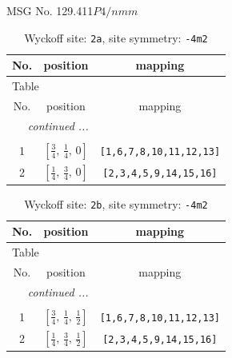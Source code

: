 \documentclass[fleqn,8pt]{jsarticle}
\begin{document}
\setcounter{MaxMatrixCols}{32}

\renewcommand{\tablename}{Table~}
\renewcommand{\figurename}{Figure~}
\begin{center}
\LARGE
MSG No. 129.411\quad$P4/nmm$
\end{center}
\renewcommand{\arraystretch}{1.2}
\begin{longtable}{ccc}
\caption{Wyckoff site: {\tt 2a}, site symmetry: {\tt -4m2}}
 \\
 \hline \hline
No. & position & mapping \\ \hline \endfirsthead

\multicolumn{2}{l}{\tablename\ \thetable{}} \\
 \hline \hline
No. & position & mapping \\ \hline \endhead

 \hline \hline
\multicolumn{2}{r}{\footnotesize\it continued ...} \\ \endfoot

 \hline \hline
\multicolumn{2}{r}{} \\ \endlastfoot

1 & $\left[ \frac{3}{4},\, \frac{1}{4},\, 0 \right]$ & {\tt [1,6,7,8,10,11,12,13]} \\ \hline
2 & $\left[ \frac{1}{4},\, \frac{3}{4},\, 0 \right]$ & {\tt [2,3,4,5,9,14,15,16]} \\
\end{longtable}
\renewcommand{\arraystretch}{1.2}
\begin{longtable}{ccc}
\caption{Wyckoff site: {\tt 2b}, site symmetry: {\tt -4m2}}
 \\
 \hline \hline
No. & position & mapping \\ \hline \endfirsthead

\multicolumn{2}{l}{\tablename\ \thetable{}} \\
 \hline \hline
No. & position & mapping \\ \hline \endhead

 \hline \hline
\multicolumn{2}{r}{\footnotesize\it continued ...} \\ \endfoot

 \hline \hline
\multicolumn{2}{r}{} \\ \endlastfoot

1 & $\left[ \frac{3}{4},\, \frac{1}{4},\, \frac{1}{2} \right]$ & {\tt [1,6,7,8,10,11,12,13]} \\ \hline
2 & $\left[ \frac{1}{4},\, \frac{3}{4},\, \frac{1}{2} \right]$ & {\tt [2,3,4,5,9,14,15,16]} \\
\end{longtable}
\end{document}

